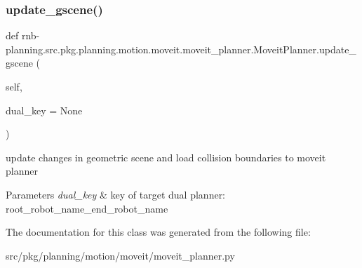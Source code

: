 \subsubsection{\texorpdfstring{update\+\_\+gscene()}{update\_gscene()}}
{\footnotesize\ttfamily def rnb-\/planning.\+src.\+pkg.\+planning.\+motion.\+moveit.\+moveit\+\_\+planner.\+Moveit\+Planner.\+update\+\_\+gscene (\begin{DoxyParamCaption}\item[{}]{self,  }\item[{}]{dual\+\_\+key = {\ttfamily None} }\end{DoxyParamCaption})}



update changes in geometric scene and load collision boundaries to moveit planner 


\begin{DoxyParams}{Parameters}
{\em dual\+\_\+key} & key of target dual planner\+: root\+\_\+robot\+\_\+name\+\_\+end\+\_\+robot\+\_\+name \\
\hline
\end{DoxyParams}


The documentation for this class was generated from the following file\+:\begin{DoxyCompactItemize}
\item 
src/pkg/planning/motion/moveit/moveit\+\_\+planner.\+py\end{DoxyCompactItemize}
